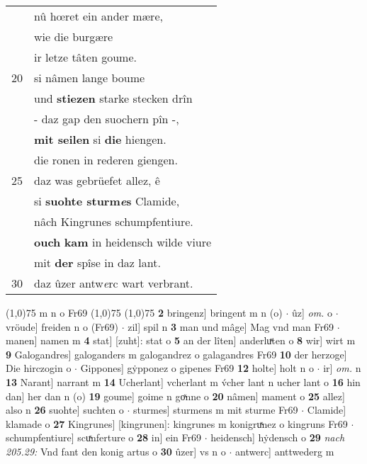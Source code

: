 \documentclass[8pt,a4paper,notitlepage]{article}
\begin{document}
\begin{table}[ht]
\begin{minipage}[t]{0.5\linewidth}
\begin{tabular}{rl}
 & nû hœret ein ander mære,\\ 
 & wie die burgære\\ 
 & ir letze tâten goume.\\ 
20 & si nâmen lange boume\\ 
 & und \textbf{stiezen} starke stecken drîn\\ 
 & - daz gap den suochern pîn -,\\ 
 & \textbf{mit seilen} si \textbf{die} hiengen.\\ 
 & die ronen in rederen giengen.\\ 
25 & daz was gebrüefet allez, ê\\ 
 & si \textbf{suohte sturm\textit{e}s} Clamide,\\ 
 & nâch Kingrunes schumpfentiure.\\ 
 & \textbf{ouch} \textbf{kam} in heidensch wilde viure\\ 
 & mit \textbf{der} spîse in daz lant.\\ 
30 & daz ûzer antw\textit{e}rc wart verbrant.\\ 
\end{tabular}
\scriptsize
\line(1,0){75} \newline
m n o Fr69 \newline
\line(1,0){75} \newline
\newline
\line(1,0){75} \newline
\textbf{2} bringenz] bringent m n (o)  $\cdot$ ûz] \textit{om.} o  $\cdot$ vröude] freiden n o (Fr69)  $\cdot$ zil] spil n \textbf{3} man und mâge] Mag vnd man Fr69  $\cdot$ manen] namen m \textbf{4} stat] [zuht]: stat o \textbf{5} an der lîten] anderluͯten o \textbf{8} wir] wirt m \textbf{9} Galogandres] galoganders m galogandrez o galagandres Fr69 \textbf{10} der herzoge] Die hirczogin o  $\cdot$ Gippones] gẏpponez o gipenes Fr69 \textbf{12} holte] holt n o  $\cdot$ ir] \textit{om.} n \textbf{13} Narant] narrant m \textbf{14} Ucherlant] vcherlant m v́cher lant n ucher lant o \textbf{16} hin dan] her dan n (o) \textbf{19} goume] goime n goͯnne o \textbf{20} nâmen] mament o \textbf{25} allez] also n \textbf{26} suohte] suchten o  $\cdot$ sturmes] sturmens m mit sturme Fr69  $\cdot$ Clamide] klamade o \textbf{27} Kingrunes] [kingrunen]: kingrunes m konigruͯnez o kingruns Fr69  $\cdot$ schumpfentiure] scuͯnferture o \textbf{28} in] ein Fr69  $\cdot$ heidensch] hẏdensch o \textbf{29} \textit{nach 205.29:} Vnd fant den konig artus o  \textbf{30} ûzer] vs n o  $\cdot$ antwerc] anttwederg m \newline
\end{minipage}
\end{table}
\end{document}
